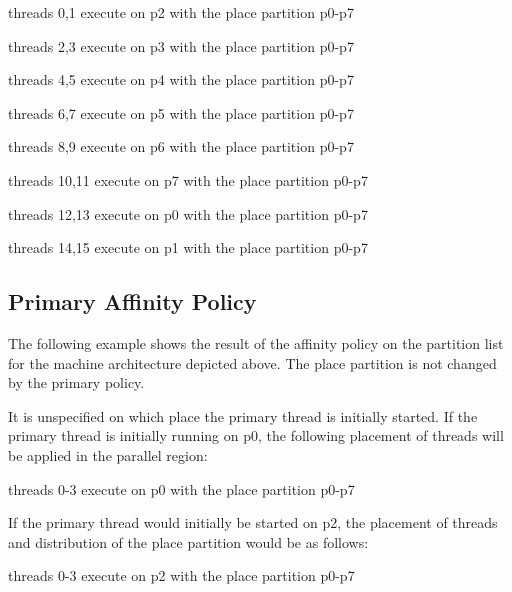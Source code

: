 \begin{compactitem}
\item threads 0,1 execute on p2 with the place partition p0-p7

\item threads 2,3 execute on p3 with the place partition p0-p7

\item threads 4,5 execute on p4 with the place partition p0-p7

\item threads 6,7 execute on p5 with the place partition p0-p7

\item threads 8,9 execute on p6 with the place partition p0-p7

\item threads 10,11 execute on p7 with the place partition p0-p7

\item threads 12,13 execute on p0 with the place partition p0-p7

\item threads 14,15 execute on p1 with the place partition p0-p7
\end{compactitem}

\subsection{Primary Affinity Policy}
\label{subsec:affinity_primary}

The following example shows the result of the  affinity policy on 
the partition list for the machine architecture depicted above. The place partition 
is not changed by the primary policy.



It is unspecified on which place the primary thread is initially started. If the 
primary thread is initially running on p0, the following placement of threads will 
be applied in the parallel region:

\begin{compactitem}
\item threads 0-3 execute on p0 with the place partition p0-p7
\end{compactitem}

If the primary thread would initially be started on p2, the placement of threads 
and distribution of the place partition would be as follows:

\begin{compactitem}
\item threads 0-3 execute on p2 with the place partition p0-p7
\end{compactitem}


